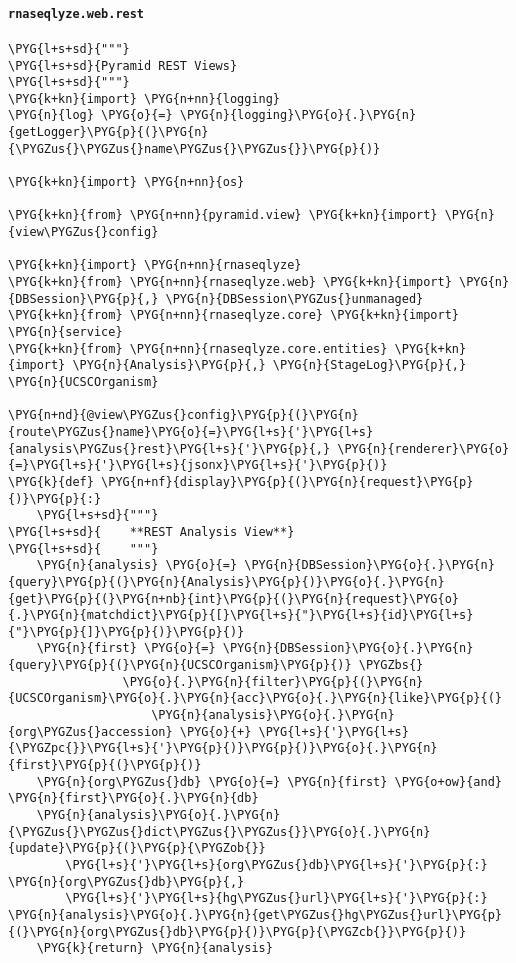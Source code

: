 \paragraph{\texttt{rnaseqlyze.web.rest}}
\label{index-pdf4:rnaseqlyze-web-rest}
\begin{Verbatim}[commandchars=\\\{\}]
\PYG{l+s+sd}{"""}
\PYG{l+s+sd}{Pyramid REST Views}
\PYG{l+s+sd}{"""}
\PYG{k+kn}{import} \PYG{n+nn}{logging}
\PYG{n}{log} \PYG{o}{=} \PYG{n}{logging}\PYG{o}{.}\PYG{n}{getLogger}\PYG{p}{(}\PYG{n}{\PYGZus{}\PYGZus{}name\PYGZus{}\PYGZus{}}\PYG{p}{)}

\PYG{k+kn}{import} \PYG{n+nn}{os}

\PYG{k+kn}{from} \PYG{n+nn}{pyramid.view} \PYG{k+kn}{import} \PYG{n}{view\PYGZus{}config}

\PYG{k+kn}{import} \PYG{n+nn}{rnaseqlyze}
\PYG{k+kn}{from} \PYG{n+nn}{rnaseqlyze.web} \PYG{k+kn}{import} \PYG{n}{DBSession}\PYG{p}{,} \PYG{n}{DBSession\PYGZus{}unmanaged}
\PYG{k+kn}{from} \PYG{n+nn}{rnaseqlyze.core} \PYG{k+kn}{import} \PYG{n}{service}
\PYG{k+kn}{from} \PYG{n+nn}{rnaseqlyze.core.entities} \PYG{k+kn}{import} \PYG{n}{Analysis}\PYG{p}{,} \PYG{n}{StageLog}\PYG{p}{,} \PYG{n}{UCSCOrganism}

\PYG{n+nd}{@view\PYGZus{}config}\PYG{p}{(}\PYG{n}{route\PYGZus{}name}\PYG{o}{=}\PYG{l+s}{'}\PYG{l+s}{analysis\PYGZus{}rest}\PYG{l+s}{'}\PYG{p}{,} \PYG{n}{renderer}\PYG{o}{=}\PYG{l+s}{'}\PYG{l+s}{jsonx}\PYG{l+s}{'}\PYG{p}{)}
\PYG{k}{def} \PYG{n+nf}{display}\PYG{p}{(}\PYG{n}{request}\PYG{p}{)}\PYG{p}{:}
    \PYG{l+s+sd}{"""}
\PYG{l+s+sd}{    **REST Analysis View**}
\PYG{l+s+sd}{    """}
    \PYG{n}{analysis} \PYG{o}{=} \PYG{n}{DBSession}\PYG{o}{.}\PYG{n}{query}\PYG{p}{(}\PYG{n}{Analysis}\PYG{p}{)}\PYG{o}{.}\PYG{n}{get}\PYG{p}{(}\PYG{n+nb}{int}\PYG{p}{(}\PYG{n}{request}\PYG{o}{.}\PYG{n}{matchdict}\PYG{p}{[}\PYG{l+s}{"}\PYG{l+s}{id}\PYG{l+s}{"}\PYG{p}{]}\PYG{p}{)}\PYG{p}{)}
    \PYG{n}{first} \PYG{o}{=} \PYG{n}{DBSession}\PYG{o}{.}\PYG{n}{query}\PYG{p}{(}\PYG{n}{UCSCOrganism}\PYG{p}{)} \PYGZbs{}
                \PYG{o}{.}\PYG{n}{filter}\PYG{p}{(}\PYG{n}{UCSCOrganism}\PYG{o}{.}\PYG{n}{acc}\PYG{o}{.}\PYG{n}{like}\PYG{p}{(}
                    \PYG{n}{analysis}\PYG{o}{.}\PYG{n}{org\PYGZus{}accession} \PYG{o}{+} \PYG{l+s}{'}\PYG{l+s}{\PYGZpc{}}\PYG{l+s}{'}\PYG{p}{)}\PYG{p}{)}\PYG{o}{.}\PYG{n}{first}\PYG{p}{(}\PYG{p}{)}
    \PYG{n}{org\PYGZus{}db} \PYG{o}{=} \PYG{n}{first} \PYG{o+ow}{and} \PYG{n}{first}\PYG{o}{.}\PYG{n}{db}
    \PYG{n}{analysis}\PYG{o}{.}\PYG{n}{\PYGZus{}\PYGZus{}dict\PYGZus{}\PYGZus{}}\PYG{o}{.}\PYG{n}{update}\PYG{p}{(}\PYG{p}{\PYGZob{}}
        \PYG{l+s}{'}\PYG{l+s}{org\PYGZus{}db}\PYG{l+s}{'}\PYG{p}{:} \PYG{n}{org\PYGZus{}db}\PYG{p}{,}
        \PYG{l+s}{'}\PYG{l+s}{hg\PYGZus{}url}\PYG{l+s}{'}\PYG{p}{:} \PYG{n}{analysis}\PYG{o}{.}\PYG{n}{get\PYGZus{}hg\PYGZus{}url}\PYG{p}{(}\PYG{n}{org\PYGZus{}db}\PYG{p}{)}\PYG{p}{\PYGZcb{}}\PYG{p}{)}
    \PYG{k}{return} \PYG{n}{analysis}


\end{Verbatim}
